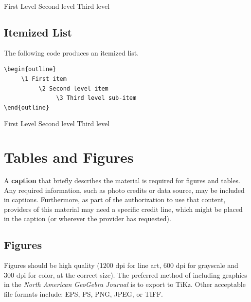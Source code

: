  \begin{outline}[enumerate]
 	\1 First Level
		\2 Second level
			\3 Third level
\end{outline}
 

 \subsection*{Itemized List}
 The following code produces an itemized list.
 
\begin{verbatim}
\begin{outline}
     \1 First item
          \2 Second level item
               \3 Third level sub-item
\end{outline}
 \end{verbatim}
 
 \begin{outline}
 	\1 First Level
		\2 Second level
			\3 Third level
\end{outline}



\section{Tables and Figures}

A \textbf{caption} that briefly describes the material is required for figures and tables.  Any required information, such as photo credits or data source, may be included in captions. Furthermore, as part of the authorization to use that content, providers of this material may need a specific credit line, which might be placed in the caption (or wherever the provider has requested).  


 \subsection*{Figures}
Figures should be high quality (1200 dpi for line art, 600 dpi for grayscale and 300 dpi for color, at the correct size). The preferred method of including graphics in the \textit{North American GeoGebra Journal} is to export to TiKz. Other acceptable file formats include: EPS, PS, PNG, JPEG, or TIFF.  
  
